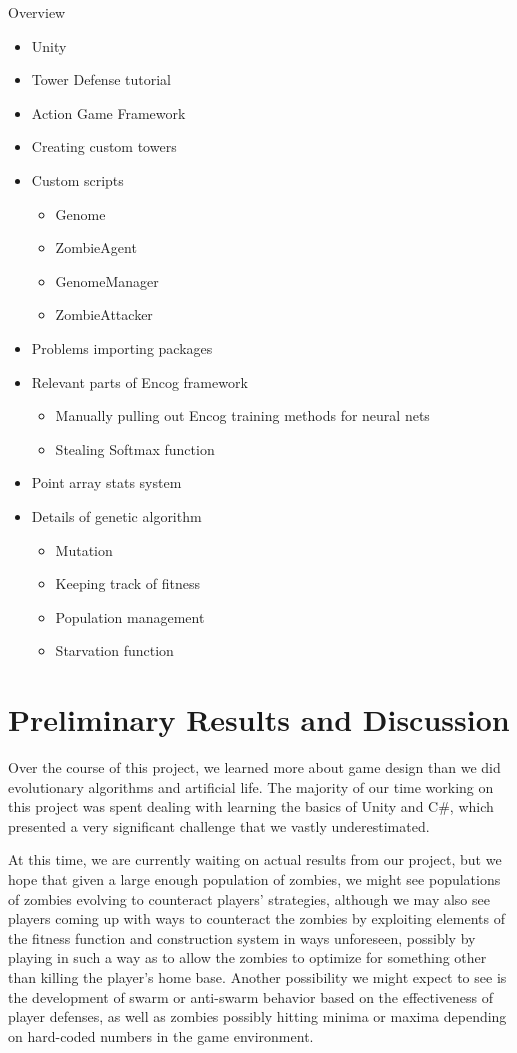\documentclass[letterpaper]{article}
\begin{document}
Overview
\begin{itemize}
    \item Unity
    \item Tower Defense tutorial
    \item Action Game Framework
    \item Creating custom towers
    \item Custom scripts
        \begin{itemize}
            \item Genome
            \item ZombieAgent
            \item GenomeManager
            \item ZombieAttacker
        \end{itemize}
    \item Problems importing packages
    \item Relevant parts of Encog framework
        \begin{itemize}
            \item Manually pulling out Encog training methods for neural nets
            \item Stealing Softmax function
        \end{itemize}
    \item Point array stats system
    \item Details of genetic algorithm
        \begin{itemize}
            \item Mutation
            \item Keeping track of fitness
            \item Population management
            \item Starvation function
        \end{itemize}
\end{itemize}


\section{Preliminary Results and Discussion}
Over the course of this project, we learned more about game design than we did evolutionary algorithms and artificial life. The majority of our time working on this project was spent dealing with learning the basics of Unity and C\#, which presented a very significant challenge that we vastly underestimated.

At this time, we are currently waiting on actual results from our project, but we hope that given a large enough population of zombies, we might see populations of zombies evolving to counteract players' strategies, although we may also see players coming up with ways to counteract the zombies by exploiting elements of the fitness function and construction system in ways unforeseen, possibly by playing in such a way as to allow the zombies to optimize for something other than killing the player's home base. Another possibility we might expect to see is the development of swarm or anti-swarm behavior based on the effectiveness of player defenses, as well as zombies possibly hitting minima or maxima depending on hard-coded numbers in the game environment.
\end{document}
